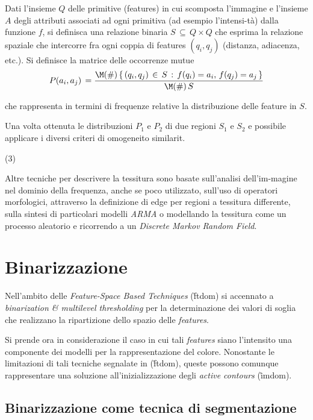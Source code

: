 Dati l'insieme $Q$ delle primitive (features) in cui \e scomposta l'immagine e l'insieme
$A$ degli attributi associati ad ogni primitiva (ad esempio l'intensi-t\`a) dalla
funzione $f$, si definisca una relazione binaria $S\,\subseteq\,Q \times Q$ che esprima
la relazione spaziale che intercorre fra ogni coppia di features $(q_i,q_j)$
(distanza, adiacenza, etc.).
Si definisce la matrice delle occorrenze mutue
$$
P(a_i,a_j)\,=\frac{\M(\#)\,\{\,(q_i,q_j)\,\in\,S\,:\,f(q_i)=a_i,\,f(q_j)=a_j\,\}}{\M(\#)\,S}
$$
\edf
 
che rappresenta in termini di frequenze relative la distribuzione delle feature in $S$.

Una volta ottenuta le distribuzioni $P_1$ e $P_2$ di due regioni $S_1$ e $S_2$
e possibile applicare i diversi criteri di omogeneit\a o similarit\a.

\vs(3)

Altre tecniche per descrivere la tessitura sono basate sull'analisi dell'im-magine nel dominio
della frequenza, anche se poco utilizzato, sull'uso di operatori morfologici, attraverso
la definizione di edge per regioni a tessitura differente, sulla sintesi  di particolari
modelli {\sl ARMA} o modellando la tessitura come un processo aleatorio e ricorrendo
a un {\it Discrete Markov Random Field}.

\section{Binarizzazione}

Nell'ambito delle {\it Feature-Space Based Techniques} (\r{ftdom}) si \e accennato
a {\it binarization \& multilevel thresholding} per la determinazione dei valori di soglia
che realizzano la ripartizione dello spazio delle {\it features}.

Si prende ora in considerazione il caso in cui tali {\it features} siano l'intensit\a o una componente dei
modelli per la rappresentazione del colore.
Nonostante le limitazioni di tali tecniche segnalate in (\r{ftdom}), queste possono comunque
rappresentare una soluzione all'inizializzazione degli {\it active contours} (\r{imdom}).  

\subsection{Binarizzazione come tecnica di segmentazione}

